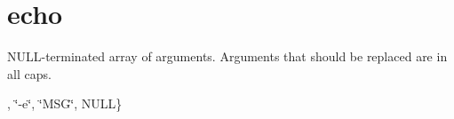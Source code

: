 \hypertarget{echo-example}{}\section{echo}
N\+U\+L\+L-\/terminated array of arguments. Arguments that should be replaced are in all caps.

, \char`\"{}-\/e\char`\"{}, \char`\"{}\+M\+S\+G\char`\"{}, N\+U\+L\+L\}


\begin{DoxyCodeInclude}
\end{DoxyCodeInclude}
 